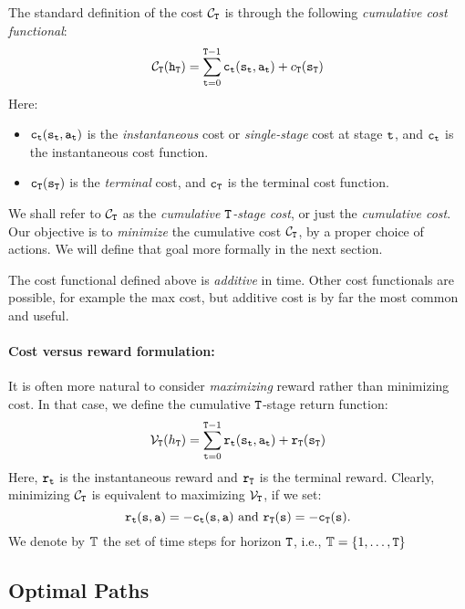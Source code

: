 The standard definition of the cost ${\mathcal{C}_{\tt T}}$ is through
the following \emph{cumulative cost functional}:
\[{\mathcal{C}_{\tt T}}({{\tt h}_{\tt T}}) = \sum_{{\tt t} = 0}^{{\tt T} - 1} {{{\tt c}_{{\tt t}}}({{\tt s}_{{\tt t}}},{{\tt a}_{{\tt t}}}) + {c_{\tt T}}({{\tt s}_{\tt T}})} \]
Here:
    \begin{itemize}
    \item
${{\tt c}_{{\tt t}}}({{\tt s}_{{\tt t}}},{{\tt a}_{{\tt t}}})$ is the
\emph{instantaneous}  cost or \emph{single-stage }cost at stage
${\tt t}$, and ${{\tt c}_{{\tt t}}}$ is the instantaneous cost function.
    \item
${{\tt c}_{\tt T}}({{\tt s}_{\tt T}})$ is the \emph{terminal} cost,
and ${{\tt c}_{\tt T}}$ is the terminal cost function.
  \end{itemize}


We shall refer to ${\mathcal{C}_{\tt T}}$ as the \emph{cumulative ${\tt T}$-stage cost}, or just the \emph{cumulative cost}.
Our objective is to \emph{minimize} the cumulative cost
${\mathcal{C}_{\tt T}}$, by a proper choice of actions. We will define
that goal more formally in the next section.

\begin{remark}
    The cost functional defined above is \emph{additive} in time. Other cost functionals are possible, for example the max cost, but additive cost is by far the most common and useful.
\end{remark}


\paragraph{Cost versus reward formulation: }
It is often more natural to consider \emph{maximizing} reward rather
than minimizing cost.  In that case, we define the cumulative
${\tt T}$-stage return function:
$${\mathcal{V}_{\tt T}}({h_{\tt T}}) = \sum_{{\tt t} = 0}^{{\tt T} - 1} {{{\tt r}_{{\tt t}}}({{\tt s}_{{\tt t}}},{{\tt a}_{{\tt t}}}) + {{\tt r}_{\tt T}}({{\tt s}_{\tt T}})} $$
Here, ${{\tt r}_{{\tt t}}}$ is the instantaneous reward and
${{\tt r}_{\tt T}}$ is the terminal reward. Clearly, minimizing
${\mathcal{C}_{\tt T}}$ is equivalent to maximizing
${\mathcal{V}_{\tt T}}$, if we set:
$${{\tt r}_{{\tt t}}}({\tt s},{\tt a}) =  - {{\tt c}_{{\tt t}}}({\tt s},{\tt a}) \text{ and }{{\tt r}_{\tt T}}({\tt s}) =  - {{\tt c}_{\tt T}}({\tt s}).$$
We denote by $\mathbb{T}$ the set of time steps for horizon ${\tt T}$, i.e.,
$\mathbb{T}=\{1, \ldots, {\tt T}\}$


\subsection{Optimal Paths}

